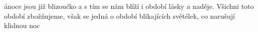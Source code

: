 \documentclass{article}
\begin{document}

ánoce jsou již blizoučko a s tím se nám blíží i období lásky a naděje.
Všichni toto období zbožňujeme, však se jedná o období blikajících světélek, co narušují klidnou noc
\end{document}
